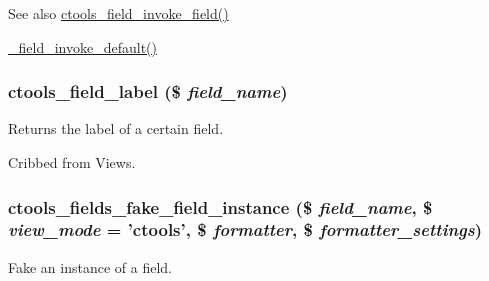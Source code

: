 \begin{DoxySeeAlso}{See also}
\hyperlink{fields_8inc_a109d8f80825dc8d999859e0d580ca8e5}{ctools\_\-field\_\-invoke\_\-field()} 

\hyperlink{group__field__attach_gaf000872e1850750f98445dfa96bfb602}{\_\-field\_\-invoke\_\-default()} 
\end{DoxySeeAlso}
\hypertarget{fields_8inc_a56fdb1540ed0662e97789fc89cec1365}{
\subsubsection[{ctools\_\-field\_\-label}]{\setlength{\rightskip}{0pt plus 5cm}ctools\_\-field\_\-label (\$ {\em field\_\-name})}}
\label{fields_8inc_a56fdb1540ed0662e97789fc89cec1365}
Returns the label of a certain field.

Cribbed from Views. \hypertarget{fields_8inc_ac6854ba7959279ea2513224ed3375628}{
\subsubsection[{ctools\_\-fields\_\-fake\_\-field\_\-instance}]{\setlength{\rightskip}{0pt plus 5cm}ctools\_\-fields\_\-fake\_\-field\_\-instance (\$ {\em field\_\-name}, \/  \$ {\em view\_\-mode} = {\ttfamily 'ctools'}, \/  \$ {\em formatter}, \/  \$ {\em formatter\_\-settings})}}
\label{fields_8inc_ac6854ba7959279ea2513224ed3375628}
Fake an instance of a field.



